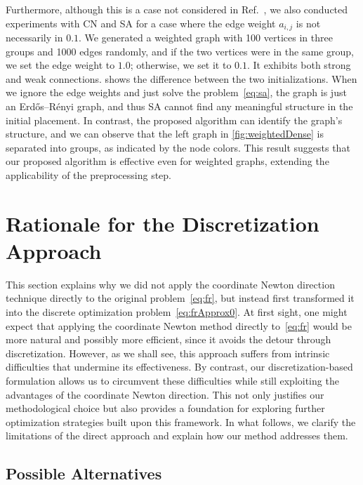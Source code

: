 \documentclass[11pt]{article}
\begin{document}
Furthermore, although this is a case not considered in Ref.~\citep{ghassemitoosiSimulatedAnnealingPreProcessing2016},
we also conducted experiments with \textsf{CN} and \textsf{SA} for a case
where the edge weight $a_{i,j}$ is not necessarily in $\qty{0,1}$. We generated
a weighted graph with 100 vertices in three groups and 1000 edges randomly,
and if the two vertices were in the same group, we set the edge weight to $1.0$; otherwise, we set it to $0.1$. It exhibits both strong and weak connections. 
shows the difference between the two initializations. When we ignore the edge weights and just solve the problem~\eqref{eq:sa}, the graph is just an Erd\H{o}s--R\'enyi
graph, and thus \textsf{SA} cannot find any meaningful structure in the
initial placement. In contrast, the proposed algorithm can identify the graph's
structure, and we can observe that the left graph in \cref{fig:weightedDense} is
separated into groups, as indicated by the node colors. This result suggests that
our proposed algorithm is effective even for weighted graphs, extending the
applicability of the preprocessing step.

\section{Rationale for the Discretization Approach}
\label{sec:rationale}

This section explains why we did not apply the coordinate Newton direction technique directly to the original problem~\eqref{eq:fr}, but instead first transformed it into the discrete optimization problem~\eqref{eq:frApprox0}.
At first sight, one might expect that applying the coordinate Newton method directly to~\eqref{eq:fr} would be more natural and possibly more efficient, since it avoids the detour through discretization. However, as we shall see, this approach suffers from intrinsic difficulties that undermine its effectiveness.
By contrast, our discretization-based formulation allows us to circumvent these difficulties while still exploiting the advantages of the coordinate Newton direction. This not only justifies our methodological choice but also provides a foundation for exploring further optimization strategies built upon this framework. In what follows, we clarify the limitations of the direct approach and explain how our method addresses them.

\subsection{Possible Alternatives}
\label{ssec:possibleApproach}
\end{document}
